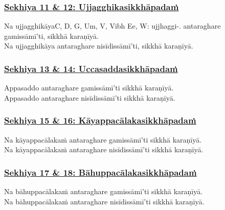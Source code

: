 \subsubsection*{\hyperref[training11-12]{Sekhiya 11 \& 12: Ujjagghikasikkhāpadaṁ}}
\label{sekh11-12}

Na ujjagghikāya\makeatletter\hyperlink{endnote-appendix}\makeatother C, D, G, Um, V, Vibh Ee, W: ujjhaggi-. antaraghare gamissāmī'ti, sikkhā karaṇīyā.\\
Na ujjagghikāya antaraghare nisīdissāmī'ti, sikkhā karaṇīyā.



\subsubsection*{\hyperref[training13-14]{Sekhiya 13 \& 14: Uccasaddasikkhāpadaṁ}}
\label{sekh13-14}

Appasaddo antaraghare gamissāmī'ti sikkhā karaṇīyā.\\
Appasaddo antaraghare nisīdissāmī'ti sikkhā karaṇīyā.



\subsubsection*{\hyperref[training15-16]{Sekhiya 15 \& 16: Kāyappacālakasikkhāpadaṁ}}
\label{sekh15-16}

Na kāyappacālakaṁ antaraghare gamissāmī'ti sikkhā karaṇīyā.\\
Na kāyappacālakaṁ antaraghare nisīdissāmī'ti sikkhā karaṇīyā.



\subsubsection*{\hyperref[training17-18]{Sekhiya 17 \& 18: Bāhuppacālakasikkhāpadaṁ}}
\label{sekh17-18}

Na bāhuppacālakaṁ antaraghare gamissāmī'ti sikkhā karaṇīyā.\\
Na bāhuppacālakaṁ antaraghare nisīdissāmī'ti sikkhā karaṇīyā.



